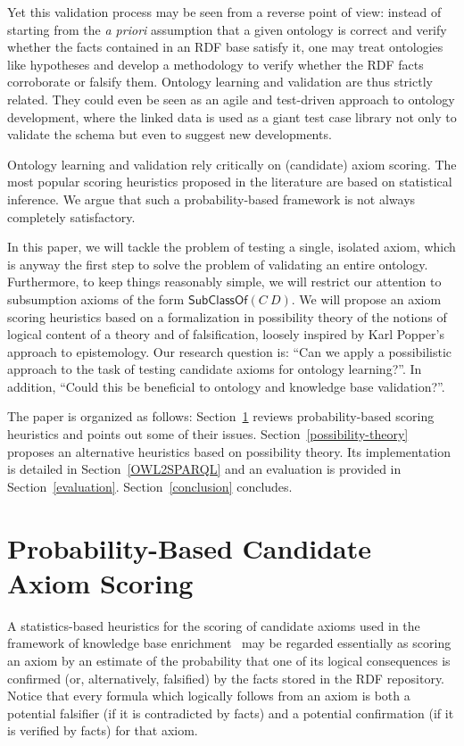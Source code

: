 \documentclass{llncs}
\begin{document}
Yet this validation process may be seen from a reverse point of view:
instead of starting from the \emph{a priori} assumption that a given ontology
is correct and verify whether the facts contained in an RDF base satisfy it,
one may treat ontologies like hypotheses and develop a methodology to verify
whether the RDF facts corroborate or falsify them. Ontology learning and validation
are thus strictly related.
They could even be seen as an agile and test-driven approach to ontology development,
where the linked data is used as a giant test case library not only to validate the
schema but even to suggest new developments.

Ontology learning and validation rely critically on (candidate) axiom scoring.
The most popular scoring heuristics proposed in the literature are based on statistical inference.
We argue that such a probability-based framework is not always completely satisfactory.

In this paper, we will tackle the problem of testing a single, isolated axiom,
which is anyway the first step to solve the problem of validating an entire ontology.
Furthermore, to keep things reasonably simple, we will restrict our attention
to subsumption axioms of the form $\mathsf{SubClassOf}(C\ D)$.
We will propose an axiom scoring heuristics based on a formalization in possibility theory of
the notions of logical content of a theory and of falsification, loosely inspired
by Karl Popper's approach to epistemology. Our research question is: ``Can we apply
a possibilistic approach to the task of testing candidate axioms for ontology learning?''.
In addition, ``Could this be beneficial to ontology and knowledge base validation?''.

The paper is organized as follows:
Section~\ref{probability} reviews probability-based scoring heuristics and
points out some of their issues. 
Section~\ref{possibility-theory} proposes an alternative heuristics based
on possibility theory. Its implementation is detailed in
Section~\ref{OWL2SPARQL} and an evaluation is provided in Section~\ref{evaluation}.
Section~\ref{conclusion} concludes.

\section{Probability-Based Candidate Axiom Scoring}
\label{probability}

A statistics-based heuristics for the scoring of candidate axioms used
in the framework of knowledge base enrichment~\cite{BuehmannLehmann2012}
may be regarded essentially as scoring an axiom by an estimate of the probability
that one of its logical consequences is confirmed (or, alternatively, falsified)
by the facts stored in the RDF repository.
Notice that every formula which logically follows from an axiom is both
a potential falsifier (if it is contradicted by facts)
and a potential confirmation (if it is verified by facts) for that axiom.
\end{document}
